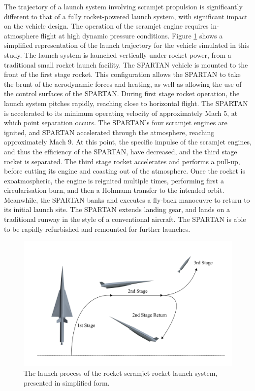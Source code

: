  The trajectory of a launch system involving scramjet propulsion is significantly different to that of a fully rocket-powered launch system, with significant impact on the vehicle design. The operation of the scramjet engine requires in-atmosphere flight at high dynamic pressure conditions. Figure \ref{fig:Trajsimple} shows a simplified representation of the launch trajectory for the vehicle simulated in this study. The launch system is launched vertically under rocket power, from a traditional small rocket launch facility. The SPARTAN vehicle is mounted to the front of the first stage rocket. This configuration allows the SPARTAN to take the brunt of the aerodynamic forces and heating, as well as allowing the use of the control surfaces of the SPARTAN. During first stage rocket operation, the launch system pitches rapidly, reaching close to horizontal flight. The SPARTAN is accelerated to its minimum operating velocity of approximately Mach 5, at which point separation occurs. The SPARTAN's four scramjet engines are ignited, and SPARTAN accelerated through the atmosphere, reaching approximately Mach 9. At this point, the specific impulse of the scramjet engines, and thus the efficiency of the SPARTAN, have decreased, and the third stage rocket is separated. The third stage rocket accelerates and performs a pull-up, before cutting its engine and coasting out of the atmosphere. Once the rocket is exoatmospheric, the engine is reignited multiple times, performing first a circularisation burn, and then a Hohmann transfer to the intended orbit. Meanwhile, the SPARTAN banks and executes a fly-back manoeuvre to return to its initial launch site. The SPARTAN extends landing gear, and lands on a traditional runway in the style of a conventional aircraft. The SPARTAN is able to be rapidly refurbished and remounted for further launches. 


\begin{figure}
	\centering
	\includegraphics[width=0.9\linewidth]{figures/3_vehicle_design/Trajsimple}
	\caption{The launch process of the rocket-scramjet-rocket launch system, presented in simplified form.}
	\label{fig:Trajsimple}
\end{figure}




